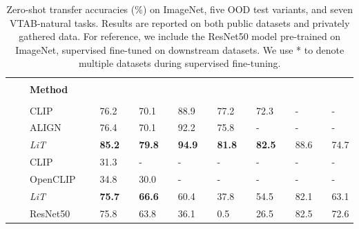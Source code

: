 \documentclass[10pt,twocolumn,letterpaper]{article}
\def \lit {LiT\xspace}
\def\objsota{82.5}
\begin{document}
\begin{table}[t]
  \setlength{\tabcolsep}{0pt}
  \setlength{\extrarowheight}{5pt}
  \renewcommand{\arraystretch}{0.75}
  \centering
  \begin{tabularx}{\linewidth}{p{0.1cm}p{0.5cm}Cp{1.5cm}Cp{0.1cm}Cp{0.1cm}Cp{0.1cm}Cp{0.1cm}Cp{0.1cm}Cp{0.1cm}C}
    \toprule[1pt]
\bf{}  &&  &&  &&  &&  &&
     &&
     &&  &&
     \\
    && \bf{Method} &&\\
    \\
    \midrule
     && CLIP~\cite{clip} && 76.2 && 70.1 && 88.9 && 77.2 && 72.3 && - && - \\
     && ALIGN~\cite{align} && 76.4 && 70.1 && 92.2 && 75.8 && - && - && -\\
     && \mbox{\textit{\lit{}}} && \bf{85.2} && \bf{79.8} && \bf{94.9} && \bf{81.8} && \bf{\objsota{}} && 88.6 && 74.7\\
     \midrule
      && CLIP~\cite{clip} && 31.3 && - && - && - && - && - && -\\
     && OpenCLIP~\cite{openclip} && 34.8 && 30.0 && - && - && - && - && - \\
     && \mbox{\textit{LiT}} && \bf{75.7} && \bf{66.6} && 60.4 && 37.8 && 54.5 && 82.1 && 63.1\\
     \midrule
      && ResNet50~\cite{resnet} && 75.8 && 63.8 && 36.1 && 0.5 && 26.5 && 82.5 && 72.6 \\
    \bottomrule[1pt]
  \end{tabularx}
  \caption{Zero-shot transfer accuracies (\%) on ImageNet,  five OOD test variants, and seven VTAB-natural tasks. Results are reported on both public datasets and privately gathered data. For reference, we include the ResNet50 model pre-trained on ImageNet, supervised fine-tuned on downstream datasets. We use * to denote multiple datasets during supervised fine-tuning.
  }\label{table:sota}
\end{table}
\end{document}
